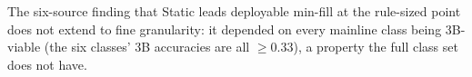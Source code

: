 The six-source finding that Static leads deployable min-fill at the
rule-sized point does not extend to fine granularity: it depended on every
mainline class being 3B-viable (the six classes' 3B accuracies are all
$\ge 0.33$), a property the full class set does not have.

